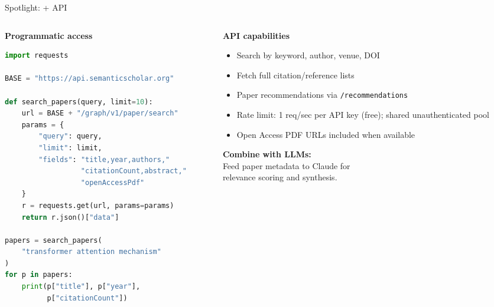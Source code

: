 \begin{frame}[fragile]{Spotlight:  + API}
  \begin{columns}[T, onlytextwidth]
    \begin{column}{0.55\textwidth}
      \textbf{Programmatic access}~\parencite{lo2023semantic}\\[0.3em]
      \begin{lstlisting}[language=python, basicstyle=\ttfamily\scriptsize]
import requests

BASE = "https://api.semanticscholar.org"

def search_papers(query, limit=10):
    url = BASE + "/graph/v1/paper/search"
    params = {
        "query": query,
        "limit": limit,
        "fields": "title,year,authors,"
                  "citationCount,abstract,"
                  "openAccessPdf"
    }
    r = requests.get(url, params=params)
    return r.json()["data"]

papers = search_papers(
    "transformer attention mechanism"
)
for p in papers:
    print(p["title"], p["year"],
          p["citationCount"])
      \end{lstlisting}
    \end{column}
    \hfill
    \begin{column}{0.42\textwidth}
      \textbf{API capabilities}\\[0.3em]
      \begin{itemize}
        \item Search by keyword, author, venue, DOI
        \item Fetch full citation/reference lists
        \item Paper recommendations via \texttt{/recommendations}
        \item Rate limit: 1 req/sec per API key (free); shared unauthenticated pool
        \item Open Access PDF URLs included when available
      \end{itemize}
      \vspace{0.4em}
      \textbf{Combine with LLMs:}\\
      Feed paper metadata to Claude for\\ relevance scoring and synthesis.
    \end{column}
  \end{columns}
\end{frame}

